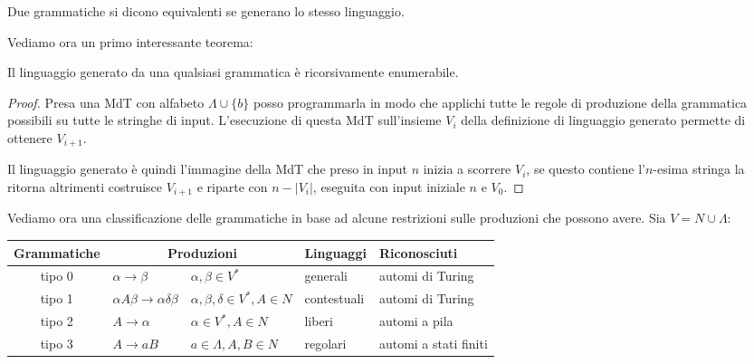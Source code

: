 \documentclass[12pt]{article}
\numberwithin{theorem}{subsection}
\begin{document}
\begin{definition}
	Due grammatiche si dicono equivalenti se generano lo stesso linguaggio.
\end{definition}

Vediamo ora un primo interessante teorema:
\begin{prop}\label{th:grammar-rec-enum}
	Il linguaggio generato da una qualsiasi grammatica è ricorsivamente enumerabile.
\end{prop}
\begin{proof}
	Presa una MdT con alfabeto $\Lambda \cup \{ b \}$ posso programmarla in modo che applichi tutte le regole di produzione della grammatica possibili su tutte le stringhe di input. L'esecuzione di questa MdT sull'insieme $V_i$ della definizione di linguaggio generato permette di ottenere $V_{i+1}$.
	
	Il linguaggio generato è quindi l'immagine della MdT che preso in input $n$ inizia a scorrere $V_i$, se questo contiene l'$n$-esima stringa la ritorna altrimenti costruisce $V_{i+1}$ e riparte con $n - |V_i|$, eseguita con input iniziale $n$ e $V_0$.
\end{proof}

Vediamo ora una classificazione delle grammatiche in base ad alcune restrizioni sulle produzioni che possono avere. Sia $V = N \cup \Lambda$:

\vspace{0.3cm}
\begin{tabular}{ *{1}{c} | *{2}{l} | *{1}{l} | *{1}{l} }
	Grammatiche & \multicolumn{2}{c|}{Produzioni} & Linguaggi & Riconosciuti\\
	\hline
	tipo 0 & $\alpha \rightarrow \beta$ & $\alpha, \beta \in V^*$ & generali & automi di Turing\\
	tipo 1 & $\alpha A \beta \rightarrow \alpha \delta \beta$ & $\alpha, \beta, \delta \in V^*, A \in N$ & contestuali & automi di Turing \\
	tipo 2 & $A \rightarrow \alpha$ & $\alpha \in V^*, A \in N$ & liberi & automi a pila\\
	tipo 3 & $A \rightarrow aB$ & $a \in \Lambda, A, B \in N$ & regolari & automi a stati finiti\\
\end{tabular}
\vspace{0.3cm}
\end{document}
